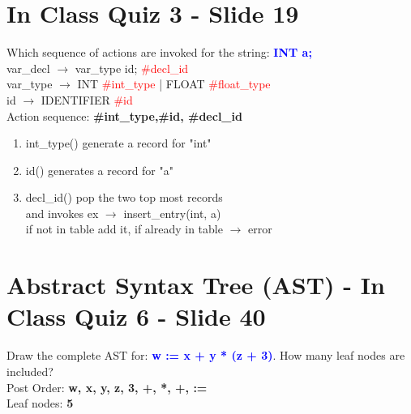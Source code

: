\documentclass{report}
\newcommand{\textb}[1]{\textcolor{blue}{#1}}
\newcommand{\textr}[1]{\textcolor{red}{#1}}
\newcommand{\textbfb}[1]{\textbf{\textb{#1}}}
\begin{document}
\section{In Class Quiz 3 - Slide 19}
Which sequence of actions are invoked for the string: \textbfb{INT a;} \\
var\_decl $\rightarrow$ var\_type id; \textr{\#decl\_id} \\
var\_type $\rightarrow$ INT \textr{\#int\_type} | FLOAT \textr{\#float\_type} \\
id $\rightarrow$ IDENTIFIER \textr{\#id} \\
Action sequence: \textbf{\#int\_type,\#id, \#decl\_id}
\vspace{-1em}
\begin{multicols}{2}
\begin{enumerate}
  \item int\_type() generate a record for "int"
  \item id() generates a record for "a"
  \item decl\_id() pop the two top most records \\
  and invokes ex $\rightarrow$ insert\_entry(int, a) \\
  if not in table add it, if already in table $\rightarrow$ error
\end{enumerate}
\end{multicols}


\section{Abstract Syntax Tree (AST) - In Class Quiz 6 - Slide 40}
\vspace{-1em}
\begin{multicols}{2}Draw the complete AST for: \textbfb{w := x + y * (z + 3)}. How many leaf nodes are included? \\
Post Order: \textbf{w, x, y, z, 3, +, *, +, :=} \\
Leaf nodes: \textbf{5} \\
     \\
\end{multicols}
\end{document}
